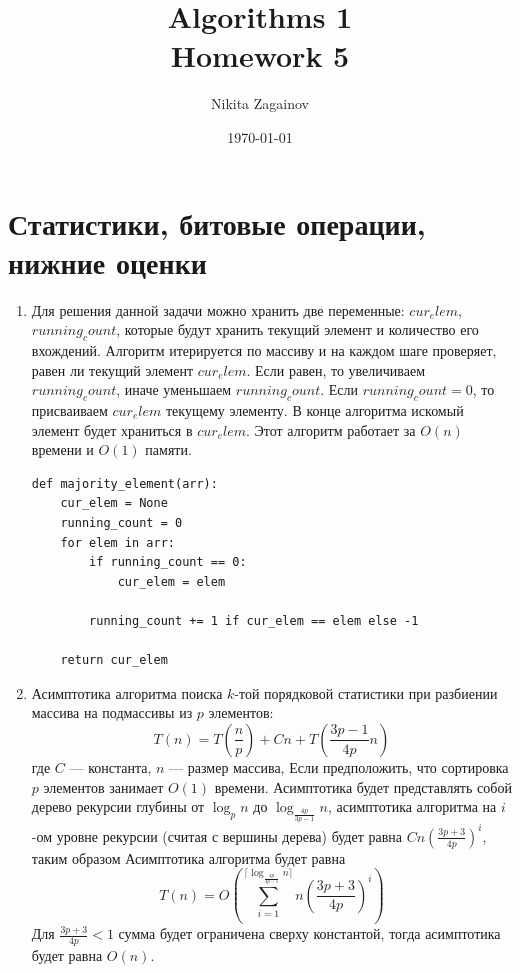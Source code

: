 \documentclass{article}
\title{Algorithms 1 \\ Homework 5}
\author{Nikita Zagainov}
\date{\today}
\begin{document}
\maketitle

\section{Статистики, битовые операции, нижние оценки}
\begin{enumerate}
    \item Для решения данной задачи можно хранить
          две переменные: $cur_elem$, $running_count$,
          которые будут хранить текущий элемент и количество
          его вхождений. Алгоритм итерируется по массиву и
          на каждом шаге проверяет, равен ли текущий элемент
          $cur_elem$. Если равен, то увеличиваем $running_count$,
          иначе уменьшаем $running_count$. Если $running_count = 0$,
          то присваиваем $cur_elem$ текущему элементу. В конце
          алгоритма искомый элемент будет храниться в $cur_elem$.
          Этот алгоритм работает за $O(n)$ времени и $O(1)$ памяти.
          \begin{lstlisting}
def majority_element(arr):
    cur_elem = None
    running_count = 0
    for elem in arr:
        if running_count == 0:
            cur_elem = elem

        running_count += 1 if cur_elem == elem else -1

    return cur_elem
    \end{lstlisting}

    \item Асимптотика алгоритма поиска $k$-той
          порядковой статистики при разбиении массива
          на подмассивы из $p$ элементов:
          \[
              T(n) = T(\frac{n}{p}) + Cn + T(\frac{3p - 1}{4p} n)
          \]
          где $C$ --- константа, $n$ --- размер массива,
          Если предположить, что сортировка $p$ элементов
          занимает $O(1)$ времени.
          Асимптотика будет представлять собой дерево
          рекурсии глубины от $\log_p n$ до
          $\log_{\frac{4p}{3p - 1}} n$, асимптотика
          алгоритма на $i$-ом уровне рекурсии
          (считая с вершины дерева) будет равна
          $Cn(\frac{3p + 3}{4p})^i$, таким образом
          Асимптотика алгоритма будет равна
          \[
              T(n) = O(\sum_{i=1}^{\lceil \log_{\frac{4p}{3p - 1}}{n} \rceil} n(\frac{3p + 3}{4p})^i)
          \]
          Для $\frac{3p + 3}{4p} < 1$ сумма будет
          ограничена сверху константой, тогда асимптотика
          будет равна $O(n)$.


\end{enumerate}
\end{document}
